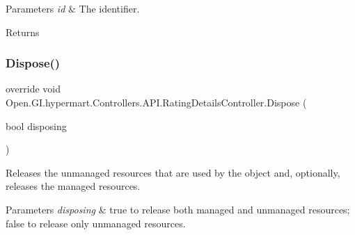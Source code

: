 \begin{DoxyParams}{Parameters}
{\em id} & The identifier.\\
\hline
\end{DoxyParams}
\begin{DoxyReturn}{Returns}

\end{DoxyReturn}
\hypertarget{class_open_1_1_g_i_1_1hypermart_1_1_controllers_1_1_a_p_i_1_1_rating_details_controller_a81ada59de033f14c4758007d4a243644}{}\label{class_open_1_1_g_i_1_1hypermart_1_1_controllers_1_1_a_p_i_1_1_rating_details_controller_a81ada59de033f14c4758007d4a243644} 
\subsubsection{\texorpdfstring{Dispose()}{Dispose()}}
{\footnotesize\ttfamily override void Open.\+G\+I.\+hypermart.\+Controllers.\+A\+P\+I.\+Rating\+Details\+Controller.\+Dispose (\begin{DoxyParamCaption}\item[{bool}]{disposing }\end{DoxyParamCaption})\hspace{0.3cm}{\ttfamily [protected]}}



Releases the unmanaged resources that are used by the object and, optionally, releases the managed resources. 


\begin{DoxyParams}{Parameters}
{\em disposing} & true to release both managed and unmanaged resources; false to release only unmanaged resources.\\
\hline
\end{DoxyParams}
\hypertarget{class_open_1_1_g_i_1_1hypermart_1_1_controllers_1_1_a_p_i_1_1_rating_details_controller_a557eb976767689358889d1728a16c167}{}\label{class_open_1_1_g_i_1_1hypermart_1_1_controllers_1_1_a_p_i_1_1_rating_details_controller_a557eb976767689358889d1728a16c167} 
